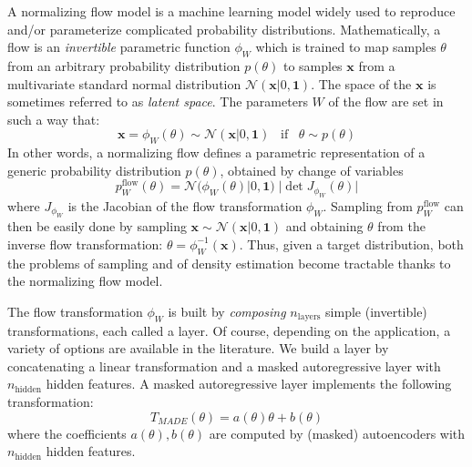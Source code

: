 \documentclass[twocolumn,showpacs,preprintnumbers,nofootinbib,prd,
superscriptaddress,10pt]{revtex4-2}
\begin{document}
A normalizing flow model \cite{norm_flow, neural_spline_flows, Kobyzev_2021, Papamakarios_thesis} is a machine learning model widely used to reproduce and/or parameterize complicated probability distributions.
Mathematically, a flow is an {\it invertible} parametric function $\phi_W$ which is trained to map samples $\theta$ from an arbitrary probability distribution $p(\theta)$ to samples $\mathbf{x}$ from a multivariate standard normal distribution $\mathcal{N}(\mathbf{x}|0,\mathbf{1})$. The space of the $\mathbf{x}$ is sometimes referred to as {\it latent space}.
The parameters $W$ of the flow are set in such a way that:
\begin{equation}
	\mathbf{x} = \phi_W(\theta) \sim \mathcal{N}(\mathbf{x}|0,\mathbf{1}) \;\;\; \text{if} \;\;\;  \theta \sim p(\theta)
\end{equation}
%
In other words, a normalizing flow defines a parametric representation of a generic probability distribution $p(\theta)$, obtained by change of variables
\begin{equation}\label{eq:p_flow}
	p^\text{flow}_W(\theta) = \mathcal{N}(\phi_W(\theta)|0,\mathbf{1}) \; |\det J_{\phi_W}(\theta)|
\end{equation}
where $J_{\phi_W}$ is the Jacobian of the flow transformation $\phi_W$.
Sampling from $p^\text{flow}_W$ can then be easily done by sampling $\mathbf{x} \sim \mathcal{N}(\mathbf{x}|0,\mathbf{1})$ and obtaining $\theta$ from the inverse flow transformation: $\theta = \phi_W^{-1}(\mathbf{x})$.
Thus, given a target distribution, both the problems of sampling and of density estimation become tractable thanks to the normalizing flow model.

The flow transformation $\phi_W$ is built by {\it composing} $n_\text{layers}$ simple (invertible) transformations, each called a layer. Of course, depending on the application, a variety of options are available in the literature.
We build a layer by concatenating a linear transformation and a masked autoregressive layer \cite{MADE, MAF, MAF_bis} with $n_\text{hidden}$ hidden features.
A masked autoregressive layer implements the following transformation:
\begin{equation}
	T_{MADE}(\theta) = a(\theta)\theta+b(\theta)
\end{equation}
where the coefficients $a(\theta), b(\theta)$ are computed by (masked) autoencoders with $n_\text{hidden}$ hidden features.
\end{document}
